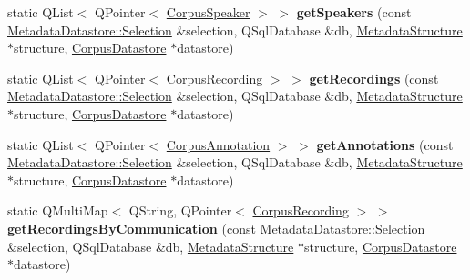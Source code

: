 \begin{DoxyCompactItemize}
\mbox{\label{class_s_q_l_serialiser_metadata_a4a93f9535c5a9641bb157238155a2f52}} 
static Q\+List$<$ Q\+Pointer$<$ \hyperlink{class_corpus_speaker}{Corpus\+Speaker} $>$ $>$ {\bfseries get\+Speakers} (const \hyperlink{class_metadata_datastore_1_1_selection}{Metadata\+Datastore\+::\+Selection} \&selection, Q\+Sql\+Database \&db, \hyperlink{class_metadata_structure}{Metadata\+Structure} $\ast$structure, \hyperlink{class_corpus_datastore}{Corpus\+Datastore} $\ast$datastore)
\item 
\mbox{\label{class_s_q_l_serialiser_metadata_ae464ccda9d76aa99f87cce3093eb8a94}} 
static Q\+List$<$ Q\+Pointer$<$ \hyperlink{class_corpus_recording}{Corpus\+Recording} $>$ $>$ {\bfseries get\+Recordings} (const \hyperlink{class_metadata_datastore_1_1_selection}{Metadata\+Datastore\+::\+Selection} \&selection, Q\+Sql\+Database \&db, \hyperlink{class_metadata_structure}{Metadata\+Structure} $\ast$structure, \hyperlink{class_corpus_datastore}{Corpus\+Datastore} $\ast$datastore)
\item 
\mbox{\label{class_s_q_l_serialiser_metadata_a0e8db7d09a7a9d97b9acaddeb6fc0fa3}} 
static Q\+List$<$ Q\+Pointer$<$ \hyperlink{class_corpus_annotation}{Corpus\+Annotation} $>$ $>$ {\bfseries get\+Annotations} (const \hyperlink{class_metadata_datastore_1_1_selection}{Metadata\+Datastore\+::\+Selection} \&selection, Q\+Sql\+Database \&db, \hyperlink{class_metadata_structure}{Metadata\+Structure} $\ast$structure, \hyperlink{class_corpus_datastore}{Corpus\+Datastore} $\ast$datastore)
\item 
\mbox{\label{class_s_q_l_serialiser_metadata_a9e1a4d41b744f7f38eb8bdad557964bb}} 
static Q\+Multi\+Map$<$ Q\+String, Q\+Pointer$<$ \hyperlink{class_corpus_recording}{Corpus\+Recording} $>$ $>$ {\bfseries get\+Recordings\+By\+Communication} (const \hyperlink{class_metadata_datastore_1_1_selection}{Metadata\+Datastore\+::\+Selection} \&selection, Q\+Sql\+Database \&db, \hyperlink{class_metadata_structure}{Metadata\+Structure} $\ast$structure, \hyperlink{class_corpus_datastore}{Corpus\+Datastore} $\ast$datastore)
\item 
\mbox{\label{class_s_q_l_serialiser_metadata_ada8b26dacecb2246bcd13b2caf82c004}} 

\end{DoxyCompactItemize}
